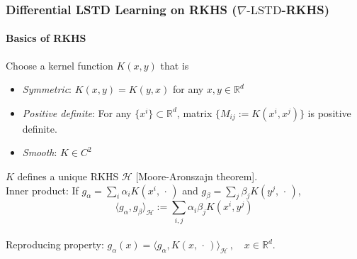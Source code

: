 \documentclass[xcolor=dvipsnames, subsection=false]{beamer}
\def\alertb#1{\alert{\color{BrickRed}  #1}}
\def\alertb#1{\alert{\color{BrickRed}  #1}}
\def\clH{{\mathcal H}}
\newcommand{\field}[1]{\mathbb{#1}}
\def\Re{\field{R}}
\def\varble{\,\cdot\,}
\def\eqdef{\mathbin{:=}}
\def\state{{\sf X}}
\def\Kern{K}
\def\gradTD{\nabla\text{-LSTD}}
\def\bl#1{{\color{blue}#1}}
\begin{document}
\begin{frame}
\frametitle{Differential LSTD Learning on RKHS ($\gradTD$-RKHS)}
\framesubtitle{Basics of RKHS}
%
%	


\begin{minipage}[t][6.5cm][t]{\textwidth}
Choose a kernel function $\Kern(x,y)$ that is 
\begin{itemize}
\item \textit{Symmetric}:  $\Kern(x,y)=\Kern(y,x)$ for any $x,y\in\Re^d$ \\
\item \textit{Positive definite}:  For any $\{x^i\}\subset \Re^d$, matrix   $\{ M_{ij}\eqdef  \Kern(x^i, x^j)\}$ is positive definite. \\
\item \textit{Smooth}: $\Kern \in C^2$ 
\end{itemize}
$\Kern$ defines a unique RKHS $\clH$ {\footnotesize\bl{[Moore-Aronszajn theorem]}}.  \\
\alertb{Inner product: } If $g_\alpha = \sum_i \alpha_i \Kern(x^i,\varble)$ and $g_\beta = \sum_j \beta_j \Kern(y^j,\varble)$,
\[
\langle g_\alpha , g_\beta\rangle_\clH \eqdef \sum_{i,j}\alpha_i \beta_j \Kern(x^i, y^j)
\]\\[-1em]
\alertb{Reproducing property:}
$g_\alpha(x)  = \langle g_\alpha , \Kern(x,\varble) \rangle_\clH \,, \quad x\in \Re^d $.
\end{minipage}
\end{frame}
\end{document}
